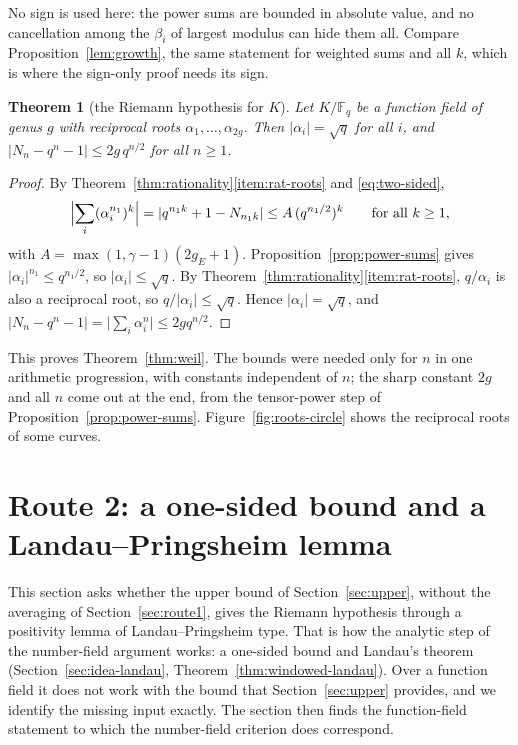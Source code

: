 \documentclass[11pt]{amsbook}
\theoremstyle{plain}
\newtheorem{theorem}{Theorem}[section]
\theoremstyle{definition}
\theoremstyle{remark}
\numberwithin{equation}{section}
\numberwithin{figure}{chapter}
\numberwithin{table}{chapter}
\newcommand{\F}{\mathbb{F}}
\begin{document}
No sign is used here: the power sums are bounded in absolute value,
and no cancellation among the $\beta_i$ of largest modulus can hide
them all. Compare Proposition~\ref{lem:growth}, the same statement
for weighted sums and all $k$, which is where the sign-only proof
needs its sign.

\begin{theorem}[the Riemann hypothesis for $K$]\label{thm:rh}
Let $K/\F_q$ be a function field of genus $g$ with reciprocal roots
$\alpha_1,\dots,\alpha_{2g}$. Then
$\lvert\alpha_i\rvert=\sqrt q$ for all $i$, and
$\lvert N_n-q^n-1\rvert\le2g\,q^{n/2}$ for all $n\ge1$.
\end{theorem}

\begin{proof}
By Theorem~\ref{thm:rationality}\eqref{item:rat-roots} and
\eqref{eq:two-sided},
\[
\Bigl\lvert\sum_i(\alpha_i^{n_1})^k\Bigr\rvert
=\lvert q^{n_1k}+1-N_{n_1k}\rvert\le A\,(q^{n_1/2})^k
\qquad\text{for all }k\ge1,
\]
with $A=\max(1,\gamma-1)(2g_E+1)$.
Proposition~\ref{prop:power-sums} gives
$\lvert\alpha_i\rvert^{n_1}\le q^{n_1/2}$, so
$\lvert\alpha_i\rvert\le\sqrt q$. By
Theorem~\ref{thm:rationality}\eqref{item:rat-roots},
$q/\alpha_i$ is also a reciprocal root, so
$q/\lvert\alpha_i\rvert\le\sqrt q$. Hence
$\lvert\alpha_i\rvert=\sqrt q$, and
$\lvert N_n-q^n-1\rvert=\lvert\sum_i\alpha_i^n\rvert
\le2gq^{n/2}$.
\end{proof}

This proves Theorem~\ref{thm:weil}. The bounds were needed only for
$n$ in one arithmetic progression, with constants independent of
$n$; the sharp constant $2g$ and all $n$ come out at the end, from
the tensor-power step of Proposition~\ref{prop:power-sums}.
Figure~\ref{fig:roots-circle} shows the reciprocal roots of some
curves.

\section{Route 2: a one-sided bound and a Landau--Pringsheim lemma}
\label{sec:route2}

This section asks whether the upper bound of
Section~\ref{sec:upper}, without the averaging of
Section~\ref{sec:route1}, gives the Riemann hypothesis through a
positivity lemma of Landau--Pringsheim type. That is how the
analytic step of the number-field argument works: a one-sided bound
and Landau's theorem (Section~\ref{sec:idea-landau},
Theorem~\ref{thm:windowed-landau}). Over a function field it does
not work with the bound that Section~\ref{sec:upper} provides, and
we identify the missing input exactly. The section then finds the
function-field statement to which the number-field criterion does
correspond.
\end{document}
